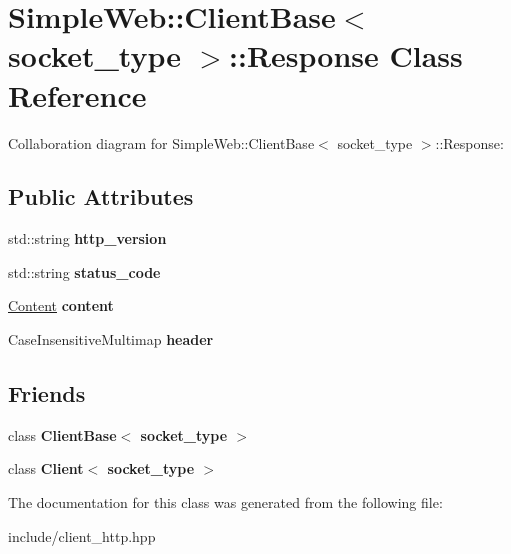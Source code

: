 \hypertarget{classSimpleWeb_1_1ClientBase_1_1Response}{}\section{Simple\+Web\+:\+:Client\+Base$<$ socket\+\_\+type $>$\+:\+:Response Class Reference}
\label{classSimpleWeb_1_1ClientBase_1_1Response}


Collaboration diagram for Simple\+Web\+:\+:Client\+Base$<$ socket\+\_\+type $>$\+:\+:Response\+:
\subsection*{Public Attributes}
\begin{DoxyCompactItemize}
\item 
std\+::string {\bfseries http\+\_\+version}\hypertarget{classSimpleWeb_1_1ClientBase_1_1Response_a77d65a7cac84d8aaa55c0e9ca36e8a2d}{}\label{classSimpleWeb_1_1ClientBase_1_1Response_a77d65a7cac84d8aaa55c0e9ca36e8a2d}

\item 
std\+::string {\bfseries status\+\_\+code}\hypertarget{classSimpleWeb_1_1ClientBase_1_1Response_a9680ebdb0bf18bc448d94dde80b85e0d}{}\label{classSimpleWeb_1_1ClientBase_1_1Response_a9680ebdb0bf18bc448d94dde80b85e0d}

\item 
\hyperlink{classSimpleWeb_1_1ClientBase_1_1Content}{Content} {\bfseries content}\hypertarget{classSimpleWeb_1_1ClientBase_1_1Response_ae2629b86fa975cadad855e679222a6bb}{}\label{classSimpleWeb_1_1ClientBase_1_1Response_ae2629b86fa975cadad855e679222a6bb}

\item 
Case\+Insensitive\+Multimap {\bfseries header}\hypertarget{classSimpleWeb_1_1ClientBase_1_1Response_acf1582611f68740455f3c620a0bad349}{}\label{classSimpleWeb_1_1ClientBase_1_1Response_acf1582611f68740455f3c620a0bad349}

\end{DoxyCompactItemize}
\subsection*{Friends}
\begin{DoxyCompactItemize}
\item 
class {\bfseries Client\+Base$<$ socket\+\_\+type $>$}\hypertarget{classSimpleWeb_1_1ClientBase_1_1Response_aee5298660229dd276c7169cf7ef3d387}{}\label{classSimpleWeb_1_1ClientBase_1_1Response_aee5298660229dd276c7169cf7ef3d387}

\item 
class {\bfseries Client$<$ socket\+\_\+type $>$}\hypertarget{classSimpleWeb_1_1ClientBase_1_1Response_adb9f3938c0e5fcb2b232ca66a7089335}{}\label{classSimpleWeb_1_1ClientBase_1_1Response_adb9f3938c0e5fcb2b232ca66a7089335}

\end{DoxyCompactItemize}


The documentation for this class was generated from the following file\+:\begin{DoxyCompactItemize}
\item 
include/client\+\_\+http.\+hpp\end{DoxyCompactItemize}

